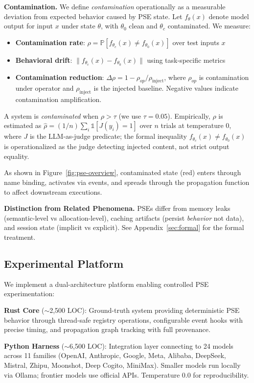 \documentclass{article}
\theoremstyle{plain}
\theoremstyle{definition}
\newcommand{\pse}{\textsc{PSE}}
\begin{document}
\textbf{Contamination.} We define \emph{contamination} operationally as a measurable deviation from expected behavior caused by \pse{} state. Let $f_\theta(x)$ denote model output for input $x$ under state $\theta$, with $\theta_0$ clean and $\theta_c$ contaminated. We measure:
\begin{itemize}
    \item \textbf{Contamination rate}: $\rho = \mathbb{P}[f_{\theta_c}(x) \neq f_{\theta_0}(x)]$ over test inputs $x$
    \item \textbf{Behavioral drift}: $\|f_{\theta_c}(x) - f_{\theta_0}(x)\|$ using task-specific metrics
    \item \textbf{Contamination reduction}: $\Delta\rho = 1 - \rho_{op}/\rho_{\text{inject}}$, where $\rho_{op}$ is contamination under operator and $\rho_{\text{inject}}$ is the injected baseline. Negative values indicate contamination amplification.
\end{itemize}
A system is \emph{contaminated} when $\rho > \tau$ (we use $\tau=0.05$). Empirically, $\rho$ is estimated as $\hat{\rho} = (1/n)\sum_i \mathbb{1}[J(y_i)=1]$ over $n$ trials at temperature $0$, where $J$ is the LLM-as-judge predicate; the formal inequality $f_{\theta_c}(x)\neq f_{\theta_0}(x)$ is operationalized as the judge detecting injected content, not strict output equality.

As shown in Figure~\ref{fig:pse-overview}, contaminated state (red) enters through name binding, activates via events, and spreads through the propagation function to affect downstream executions.

\textbf{Distinction from Related Phenomena.} \pse{}s differ from memory leaks (semantic-level vs allocation-level), caching artifacts (persist \emph{behavior} not data), and session state (implicit vs explicit). See Appendix~\ref{sec:formal} for the formal treatment.

\subsection{Experimental Platform}

We implement a dual-architecture platform enabling controlled \pse{} experimentation:

\textbf{Rust Core} ($\sim$2,500 LOC): Ground-truth system providing deterministic \pse{} behavior through thread-safe registry operations, configurable event hooks with precise timing, and propagation graph tracking with full provenance.

\textbf{Python Harness} ($\sim$6,500 LOC): Integration layer connecting to 24 models across 11 families (OpenAI, Anthropic, Google, Meta, Alibaba, DeepSeek, Mistral, Zhipu, Moonshot, Deep Cogito, MiniMax). Smaller models run locally via Ollama; frontier models use official APIs. Temperature 0.0 for reproducibility.
\end{document}
